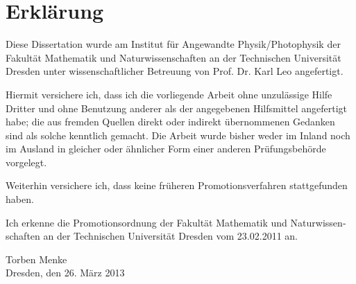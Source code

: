 \chapter*{Erklärung}
%
%
\begin{otherlanguage}{ngerman}
Diese Dissertation wurde am Institut für Angewandte Physik/Photophysik der Fakultät Mathematik und Naturwissenschaften an der Technischen Universität Dresden unter wissenschaftlicher Betreuung von Prof. Dr. Karl Leo angefertigt.

Hiermit versichere ich, dass ich die vorliegende Arbeit ohne unzulässige Hilfe Dritter und ohne Benutzung anderer als der angegebenen Hilfsmittel angefertigt habe; die aus fremden Quellen direkt oder indirekt übernommenen Gedanken sind als solche kenntlich gemacht. Die Arbeit wurde bisher weder im Inland noch im Ausland in gleicher oder ähnlicher Form einer anderen Prüfungsbehörde vorgelegt.

Weiterhin versichere ich, dass keine früheren Promotionsverfahren stattgefunden haben.

Ich erkenne die Promotionsordnung der Fakultät Mathematik und Naturwissenschaften an der Technischen Universität Dresden vom 23.02.2011 an.
\end{otherlanguage}


\vspace*{3cm}
\begin{flushright}
Torben Menke\\
\vspace*{1em}Dresden, den 26. März 2013
\end{flushright}

